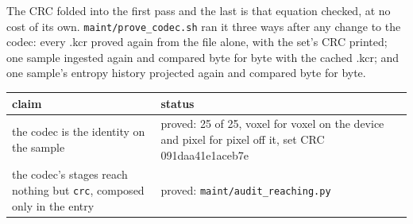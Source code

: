 The CRC folded into the first pass and the last is that equation checked, at no cost of its own. \texttt{maint/\allowbreak{}prove\_\allowbreak{}codec.\allowbreak{}sh} ran it three ways after any change to the codec: every .kcr proved again from the file alone, with the set's CRC printed; one sample ingested again and compared byte for byte with the cached .kcr; and one sample's entropy history projected again and compared byte for byte.

{\small
\setlength{\tabcolsep}{6pt}
\begin{longtable}{>{\RaggedRight\arraybackslash}p{}>{\RaggedRight\arraybackslash}p{}}
\toprule
claim & status \\
\midrule
\endhead
the codec is the identity on the sample & proved: 25 of 25, voxel for voxel on the device and pixel for pixel off it, set CRC 091daa41e1aceb7e \\
the codec's stages reach nothing but \texttt{crc}, composed only in the entry & proved: \texttt{maint/\allowbreak{}audit\_\allowbreak{}reaching.\allowbreak{}py} \\
\bottomrule
\end{longtable}
}
